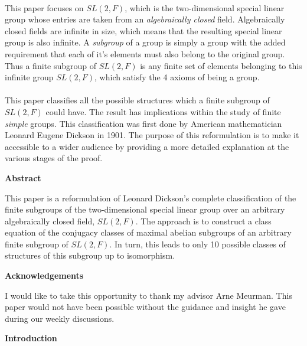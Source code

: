 \documentclass[a4paper , 11pt]{book}
\theoremstyle{definition}
\theoremstyle{remark}
\begin{document}
\\
This paper focuses on $SL(2,F)$, which is the two-dimensional special linear group whose entries are taken from an \textit{algebraically closed} field. Algebraically closed fields are infinite in size, which means that the resulting special linear group is also infinite. A \textit{subgroup} of a group is simply a group with the added requirement that each of it's elements must also belong to the original group. Thus a finite subgroup of $SL(2,F)$ is any finite set of elements belonging to this infinite group $SL(2,F)$, which satisfy the 4 axioms of being a group. \\
\\
This paper classifies all the possible structures which a finite subgroup of $SL(2,F)$ could have. The result has implications within the study of finite \textit{simple} groups. This classification was first done by American mathematician Leonard Eugene Dickson in 1901. The purpose of this reformulation is to make it accessible to a wider audience by providing a more detailed explanation at the various stages of the proof.

\cleardoublepage
\begin{center}
       \Large \textbf{Abstract}
\end{center}

This paper is a reformulation of Leonard Dickson's complete classification of the finite subgroups of the two-dimensional special linear group over an arbitrary algebraically closed field, $SL(2,F)$. The approach is to construct a class equation of the conjugacy classes of maximal abelian subgroups of an arbitrary finite subgroup of $SL(2,F)$. In turn, this leads to only 10 possible classes of structures of this subgroup up to isomorphism.

\cleardoublepage
\begin{center}
       \Large \textbf{Acknowledgements}
\end{center}

I would like to take this opportunity to thank my advisor Arne Meurman. This paper would not have been possible without the guidance and insight he gave during our weekly discussions.

\cleardoublepage

\tableofcontents

\newpage\phantom{blabla}
\thispagestyle{plain}
\mainmatter

\setcounter{chapter}{-1}

\newpage
\thispagestyle{plain}
\begin{center}
       \Large \textbf{Introduction}
\end{center}
\end{document}
